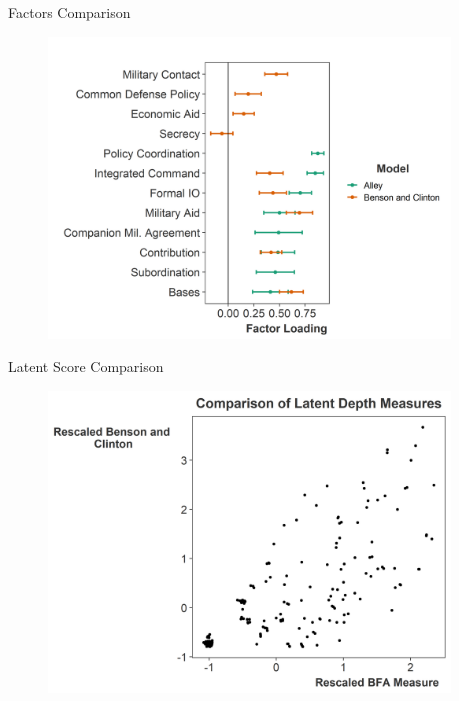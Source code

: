 \documentclass[12pt]{beamer}
\begin{document}
\begin{frame}{Factors Comparison}

\begin{figure}
	\centering
		\includegraphics[width=0.95\textwidth]{bc-factor-comp.png}
\end{figure}

\end{frame}


\begin{frame}{Latent Score Comparison}

\begin{figure}
	\centering
		\includegraphics[width=0.95\textwidth]{bc-score-comp.png}
\end{figure}

\end{frame}
\end{document}
